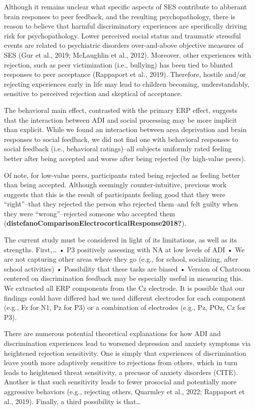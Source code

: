 \documentclass[
  man]{apa7}
\begin{document}
Although it remains unclear what specific aspects of SES contribute to abberant brain responses to peer feedback, and the resulting psychopathology, there is reason to believe that harmful discriminatory experiences are specifically driving risk for psychopathology. Lower perceived social status and traumatic stressful events are related to psychiatric disorders over-and-above objective measures of SES (Gur et al., 2019; McLaughlin et al., 2012). Moreover, other experiences with rejection, such as peer victimization (i.e., bullying) has been tied to blunted responses to peer acceptance (Rappaport et al., 2019). Therefore, hostile and/or rejecting experiences early in life may lead to children becoming, understandably, sensitive to perceived rejection and skeptical of acceptance.

The behavioral main effect, contrasted with the primary ERP effect, suggests that the interaction between ADI and social processing may be more implicit than explicit. While we found an interaction between area deprivation and brain responses to social feedback, we did not find one with behavioral responses to social feedback (i.e., behavioral ratings)--all subjects uniformly rated feeling better after being accepted and worse after being rejected (by high-value peers).

Of note, for low-value peers, participants rated being rejected as feeling better than being accepted. Although seemingly counter-intuitive, previous work suggests that this is the result of participants feeling good that they were ``right''--that they rejected the person who rejected them--and felt guilty when they were ``wrong''--rejected someone who accepted them (\textbf{distefanoComparisonElectrocorticalResponse2018?}).

The current study must be considered in light of its limitations, as well as its strengths. First,\ldots{} • P3 positively assessing with NA at low levels of ADI • We are not capturing other areas where they go (e.g., for school, socializing, after school activities) • Possibility that these tasks are biased • Version of Chatroom centered on discrimination feedback may be especially useful in measuring this. We extracted all ERP components from the Cz electrode. It is possible that our findings could have differed had we used different electrodes for each component (e.g., Fz for N1, Pz for P3) or a combination of electrodes (e.g., Pz, POz, Cz for P3).

There are numerous potential theoretical explanations for how ADI and discrimination experiences lead to worsened depression and anxiety symptoms via heightened rejection sensitivity. One is simply that experiences of discrimination leave youth more adaptively sensitive to rejections from others, which in turn leads to heightened threat sensitivity, a precusor of anxiety disorders (CITE). Another is that such sensitivity leads to fewer prosocial and potentially more aggressive behaviors (e.g., rejecting others, Quarmley et al., 2022; Rappaport et al., 2019). Finally, a third possibility is that\ldots{}
\end{document}
